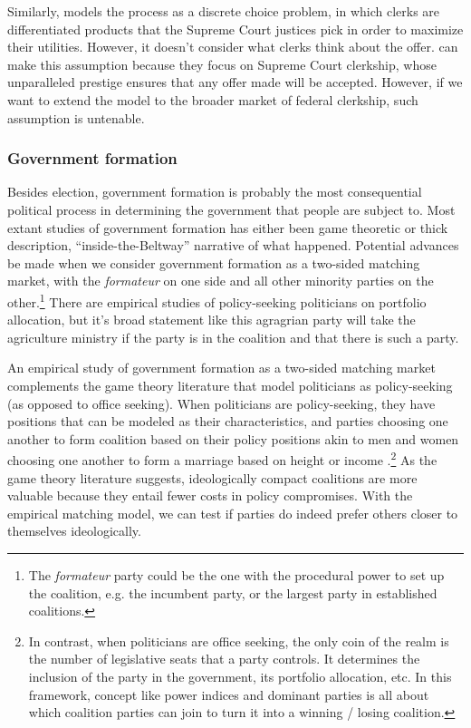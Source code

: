 Similarly, \citet{Rozema2016} models the process as a discrete choice problem, in which clerks are
differentiated products that the Supreme Court justices pick in order to
maximize their utilities. However, it doesn't consider what clerks think about
the offer. \citet{Rozema2016} can make this assumption because they focus on
Supreme Court clerkship, whose unparalleled prestige ensures that any offer made
will be accepted. However, if we want to extend the model to the
broader market of federal clerkship, such assumption is untenable.

\subsubsection{Government formation}

Besides election, government formation is probably the most consequential
political process in determining the government that people are subject to. Most
extant studies of government formation has either been game theoretic or thick description, ``inside-the-Beltway''
narrative of what happened. Potential advances be made when we consider
government formation as a two-sided matching market, with the \textit{formateur}
on one side and all other minority parties on the other.\footnote{The
  \textit{formateur} party could be the one with the procedural power to set up
  the coalition, e.g. the incumbent party, or the largest party in established
  coalitions.} There are empirical studies of policy-seeking politicians on portfolio
allocation, but it's broad statement like this agragrian party will take the
agriculture ministry if the party is in the coalition and that there is such a party.

An empirical study of government formation as a two-sided matching market complements the game theory literature that model politicians as policy-seeking (as
opposed to office seeking). When politicians are policy-seeking, they have
positions that can be modeled as their characteristics, and parties choosing one
another to form coalition based on their policy positions akin to men and women
choosing one another to form a marriage based on height or income \cite{Laver1998}.\footnote{In
  contrast, when politicians are office seeking, the only coin of the realm is the number of legislative seats that a
party controls. It determines the inclusion of the party in the government, its portfolio
allocation, etc. In this framework, concept like power indices and dominant
parties is all about which coalition parties can join to turn it into a winning /
losing coalition.} As the game theory literature suggests, ideologically compact
coalitions are more valuable because they entail fewer costs in policy
compromises. With the empirical matching model, we can test if parties do indeed
prefer others closer to themselves ideologically.

